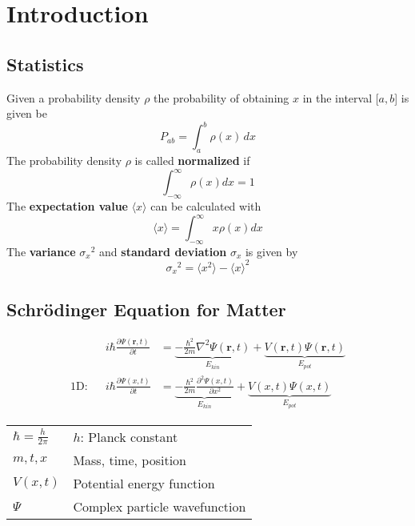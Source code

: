 \section{Introduction}
\subsection{Statistics}
Given a probability density $\rho$ the probability of obtaining $x$ in the interval [$a,b$] is given be
\begin{equation*}
    P_{ab}=\int_{a}^{b} \rho(x)\, dx
\end{equation*}
The probability density $\rho$ is called \textbf{normalized} if
\begin{equation*}
    \int_{-\infty}^{\infty}\rho(x)dx = 1
\end{equation*}
The \textbf{expectation value} $\langle x \rangle$ can be calculated with
\begin{equation*}
    \langle x \rangle = \int_{-\infty}^{\infty} x\rho(x) dx
\end{equation*}
The \textbf{variance} ${\sigma_x}^2$ and \textbf{standard deviation} $\sigma_x$ is given by
\begin{equation*}
    {\sigma_x}^2 = \langle x^2 \rangle - {\langle x \rangle }^2
\end{equation*}

\subsection{Schrödinger Equation for Matter}
\begin{align*}
               &  & i\hbar \frac{\partial \Psi(\mathbf{r},t)}{\partial t} & = \underbrace{- \frac{\hbar^2}{2m} \nabla^2 \Psi(\mathbf{r},t)}_{E_{kin}} + \underbrace{V(\mathbf{r},t)\Psi(\mathbf{r},t)}_{E_{pot}} \\
    \text{1D:} &  & i\hbar \frac{\partial \Psi(x,t)}{\partial t}          & = \underbrace{- \frac{\hbar^2}{2m} \frac{\partial^2 \Psi(x,t)}{\partial x^2}}_{E_{kin}} + \underbrace{V(x,t)\Psi(x,t)}_{E_{pot}}
\end{align*}

\renewcommand{\arraystretch}{1.3}
\setlength\tabcolsep{6pt} %
\begin{tabularx}{\linewidth}{@{}ll@{}}
    $\hbar = \frac{h}{2\pi}$ & $h$: Planck constant          \\
    $m,t,x$                  & Mass, time, position          \\
    $V(x,t)$                 & Potential energy function     \\
    $\Psi$                   & Complex particle wavefunction \\
\end{tabularx}
\renewcommand{\arraystretch}{1}
\setlength\tabcolsep{6pt} %

